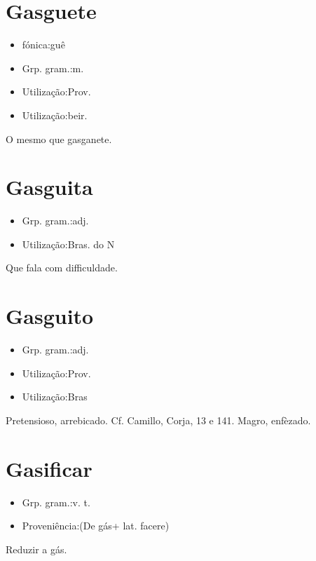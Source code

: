 \section{Gasguete}
\begin{itemize}
\item {fónica:guê}
\end{itemize}
\begin{itemize}
\item {Grp. gram.:m.}
\end{itemize}
\begin{itemize}
\item {Utilização:Prov.}
\end{itemize}
\begin{itemize}
\item {Utilização:beir.}
\end{itemize}
O mesmo que \textunderscore gasganete\textunderscore .
\section{Gasguita}
\begin{itemize}
\item {Grp. gram.:adj.}
\end{itemize}
\begin{itemize}
\item {Utilização:Bras. do N}
\end{itemize}
Que fala com difficuldade.
\section{Gasguito}
\begin{itemize}
\item {Grp. gram.:adj.}
\end{itemize}
\begin{itemize}
\item {Utilização:Prov.}
\end{itemize}
\begin{itemize}
\item {Utilização:Bras}
\end{itemize}
Pretensioso, arrebicado. Cf. Camillo, \textunderscore Corja\textunderscore , 13 e 141.
Magro, enfèzado.
\section{Gasificar}
\begin{itemize}
\item {Grp. gram.:v. t.}
\end{itemize}
\begin{itemize}
\item {Proveniência:(De \textunderscore gás\textunderscore  + lat. \textunderscore facere\textunderscore )}
\end{itemize}
Reduzir a gás.
